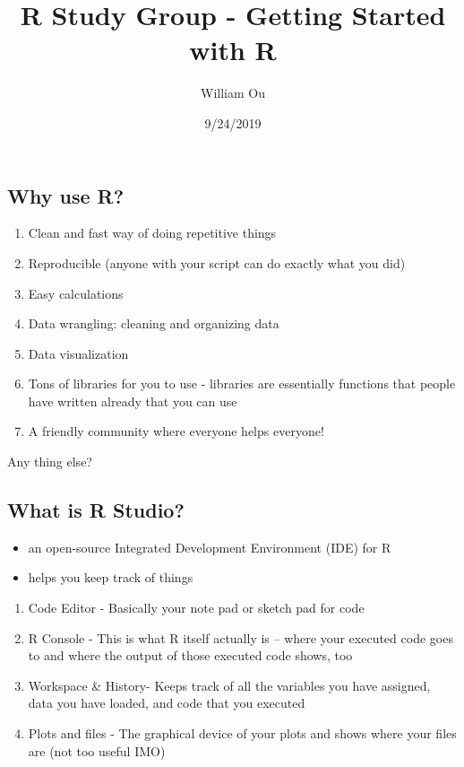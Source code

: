 \documentclass[]{article}
\title{R Study Group - Getting Started with R}
\author{William Ou}
\date{9/24/2019}
\providecommand{\tightlist}{%
  \setlength{\itemsep}{0pt}\setlength{\parskip}{0pt}}
\begin{document}
\maketitle

\subsection{Why use R?}\label{why-use-r}

\begin{enumerate}
\def\labelenumi{\arabic{enumi}.}
\tightlist
\item
  Clean and fast way of doing repetitive things
\item
  Reproducible (anyone with your script can do exactly what you did)
\item
  Easy calculations
\item
  Data wrangling: cleaning and organizing data
\item
  Data visualization
\item
  Tons of libraries for you to use - libraries are essentially functions
  that people have written already that you can use
\item
  A friendly community where everyone helps everyone!
\end{enumerate}

Any thing else?

\subsection{What is R Studio?}\label{what-is-r-studio}

\begin{itemize}
\tightlist
\item
  an open-source Integrated Development Environment (IDE) for R
\item
  helps you keep track of things
\end{itemize}

\begin{enumerate}
\def\labelenumi{\arabic{enumi}.}
\tightlist
\item
  Code Editor - Basically your note pad or sketch pad for code
\item
  R Console - This is what R itself actually is -- where your executed
  code goes to and where the output of those executed code shows, too
\item
  Workspace \& History- Keeps track of all the variables you have
  assigned, data you have loaded, and code that you executed
\item
  Plots and files - The graphical device of your plots and shows where
  your files are (not too useful IMO)
\end{enumerate}
\end{document}
